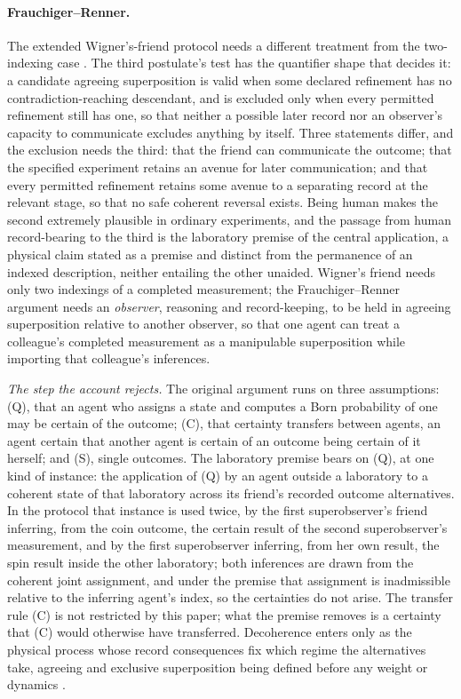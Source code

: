 \paragraph{Frauchiger--Renner.} The extended Wigner's-friend protocol needs a different treatment from the two-indexing case \cite{frauchiger2018quantum}. The third postulate's test has the quantifier shape that decides it: a candidate agreeing superposition is valid when some declared refinement has no contradiction-reaching descendant, and is excluded only when every permitted refinement still has one, so that neither a possible later record nor an observer's capacity to communicate excludes anything by itself. Three statements differ, and the exclusion needs the third: that the friend can communicate the outcome; that the specified experiment retains an avenue for later communication; and that every permitted refinement retains some avenue to a separating record at the relevant stage, so that no safe coherent reversal exists. Being human makes the second extremely plausible in ordinary experiments, and the passage from human record-bearing to the third is the laboratory premise of the central application, a physical claim stated as a premise and distinct from the permanence of an indexed description, neither entailing the other unaided. Wigner's friend needs only two indexings of a completed measurement; the Frauchiger--Renner argument needs an \emph{observer}, reasoning and record-keeping, to be held in agreeing superposition relative to another observer, so that one agent can treat a colleague's completed measurement as a manipulable superposition while importing that colleague's inferences.

\textit{The step the account rejects.} The original argument runs on three assumptions: (Q), that an agent who assigns a state and computes a Born probability of one may be certain of the outcome; (C), that certainty transfers between agents, an agent certain that another agent is certain of an outcome being certain of it herself; and (S), single outcomes. The laboratory premise bears on (Q), at one kind of instance: the application of (Q) by an agent outside a laboratory to a coherent state of that laboratory across its friend's recorded outcome alternatives. In the protocol that instance is used twice, by the first superobserver's friend inferring, from the coin outcome, the certain result of the second superobserver's measurement, and by the first superobserver inferring, from her own result, the spin result inside the other laboratory; both inferences are drawn from the coherent joint assignment, and under the premise that assignment is inadmissible relative to the inferring agent's index, so the certainties do not arise. The transfer rule (C) is not restricted by this paper; what the premise removes is a certainty that (C) would otherwise have transferred. Decoherence enters only as the physical process whose record consequences fix which regime the alternatives take, agreeing and exclusive superposition being defined before any weight or dynamics \cite{Aethus}.

